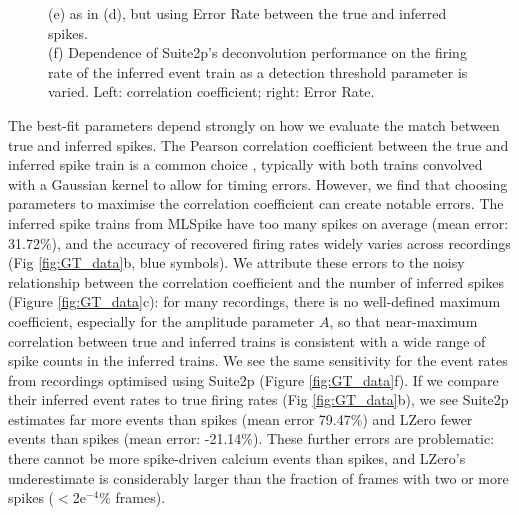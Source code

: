 \documentclass[a4paper,11pt]{article}
\begin{document}
\begin{figure}
{		(e) as in (d), but using Error Rate between the true and inferred spikes. \\
		(f) Dependence of Suite2p's deconvolution performance on the firing rate of the inferred event train as a detection threshold parameter is varied. Left: correlation coefficient; right: Error Rate.
	}
\end{figure}

The best-fit parameters depend strongly on how we evaluate the match between true and inferred spikes. The Pearson correlation coefficient between the true and inferred spike train is a common choice \citep{Brown2004-tj, Paiva2010-qv,Theis2016-ee, Reynolds2018-yh, Berens2018-su}, typically with both trains convolved with a Gaussian kernel to allow for timing errors. However, we find that choosing parameters to maximise the correlation coefficient can create notable errors. The inferred spike trains from MLSpike have too many spikes on average (mean error: 31.72$\%$), and the accuracy of recovered firing rates widely varies across recordings (Fig \ref{fig:GT_data}b, blue symbols). We attribute these errors to the noisy relationship between the correlation coefficient and the number of inferred spikes (Figure \ref{fig:GT_data}c): for many recordings, there is no well-defined maximum coefficient, especially for the amplitude parameter $A$, so that near-maximum correlation between true and inferred trains is consistent with a wide range of spike counts in the inferred trains. We see the same sensitivity for the event rates from recordings optimised using Suite2p (Figure \ref{fig:GT_data}f). If we compare their inferred event rates to true firing rates (Fig \ref{fig:GT_data}b), we see Suite2p estimates far more events than spikes (mean error 79.47$\%$) and LZero fewer events than spikes (mean error: -21.14$\%$). These further errors are problematic: there cannot be more spike-driven calcium events than spikes, and LZero's underestimate is considerably larger than the fraction of frames with two or more spikes ($<$2e$^{-4}\%$ frames).  
\end{document}
